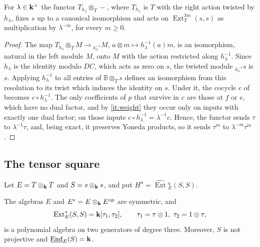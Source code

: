 \begin{lemma}
  \label{lemma:twist}
  For ${\lambda\in\mathbf{k}^\times}$ the functor ${T_{h_\lambda}\otimes_T-}$, where
  $T_{h_\lambda}$ is $T$ with the right action twisted by $h_\lambda$, fixes
  $s$ up to a canonical isomorphism and acts on $\operatorname{Ext}^{3m}_T
  (s,s)$ as multiplication by $\lambda^{-m}$, for every ${m\geq0}$.
\end{lemma}

\begin{proof}
  The map ${T_{h_\lambda}\otimes_TM\to{}_{h_\lambda^{-1}}M}$,
  ${a\otimes m\mapsto h_\lambda^{-1}(a)m}$, is an isomorphism, natural in the
  left module $M$, onto $M$ with the action restricted along $h_\lambda^{-1}$.
  Since $h_\lambda$ is the identity modulo $DC$, which acts as zero on $s$, the
  twisted module ${}_{h_\lambda^{-1}}s$ is $s$. Applying $h_\lambda^{-1}$ to all
  entries of ${\mathbb{B}\otimes_Ts}$ defines an isomorphism from this
  resolution to its twist which induces the identity on $s$. Under it, the
  cocycle $c$ of  becomes ${c\circ h_\lambda^{-1}}$.
  The only coefficients of $p$ that survive in $c$ are those at $f$ or $e$,
  which have no dual factor, and by \eqref{it:weight} they
  occur only on inputs with exactly one dual factor; on those inputs
  ${c\circ h_\lambda^{-1}=\lambda^{-1}c}$. Hence, the functor sends $\tau$ to
  $\lambda^{-1}\tau$, and, being exact, it preserves Yoneda products, so it
  sends $\tau^m$ to $\lambda^{-m}\tau^m$.
\end{proof}

\subsection{The tensor square}
\label{subsec:tensor-square}

Let ${E=T\otimes_{\mathbf{k}} T}$ and ${S=s\otimes_{\mathbf{k}} s}$, and put
${H^a}={\widehat{\operatorname{Ext}}{}^a_E(S,S)}$.

\begin{proposition}
  \label{prop:E-ext}
  The algebras $E$ and ${E^e=E\otimes_{\mathbf{k}} E^{\mathrm{op}}}$ are symmetric, and
  \[
    \operatorname{Ext}^*_E(S,S)=\mathbf{k}[\tau_1,\tau_2],\qquad
    \tau_1=\tau\otimes1,\ \tau_2=1\otimes\tau,
  \]
  is a polynomial algebra on two generators of degree three. Moreover, $S$ is
  not projective and ${\underline{\operatorname{End}}_E(S)=\mathbf{k}}$.
\end{proposition}

